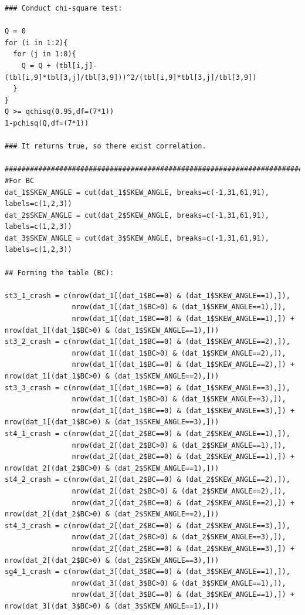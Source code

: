 \documentclass[11pt]{scrartcl} %
\begin{document}
\begin{lstlisting}
### Conduct chi-square test:

Q = 0
for (i in 1:2){
  for (j in 1:8){
    Q = Q + (tbl[i,j]-(tbl[i,9]*tbl[3,j]/tbl[3,9]))^2/(tbl[i,9]*tbl[3,j]/tbl[3,9])
  }
}
Q >= qchisq(0.95,df=(7*1))
1-pchisq(Q,df=(7*1))

### It returns true, so there exist correlation.

################################################################################
#For BC
dat_1$SKEW_ANGLE = cut(dat_1$SKEW_ANGLE, breaks=c(-1,31,61,91), labels=c(1,2,3))
dat_2$SKEW_ANGLE = cut(dat_2$SKEW_ANGLE, breaks=c(-1,31,61,91), labels=c(1,2,3))
dat_3$SKEW_ANGLE = cut(dat_3$SKEW_ANGLE, breaks=c(-1,31,61,91), labels=c(1,2,3))

## Forming the table (BC):

st3_1_crash = c(nrow(dat_1[(dat_1$BC==0) & (dat_1$SKEW_ANGLE==1),]),
                nrow(dat_1[(dat_1$BC>0) & (dat_1$SKEW_ANGLE==1),]),
                nrow(dat_1[(dat_1$BC==0) & (dat_1$SKEW_ANGLE==1),]) + nrow(dat_1[(dat_1$BC>0) & (dat_1$SKEW_ANGLE==1),]))
st3_2_crash = c(nrow(dat_1[(dat_1$BC==0) & (dat_1$SKEW_ANGLE==2),]),
                nrow(dat_1[(dat_1$BC>0) & (dat_1$SKEW_ANGLE==2),]),
                nrow(dat_1[(dat_1$BC==0) & (dat_1$SKEW_ANGLE==2),]) + nrow(dat_1[(dat_1$BC>0) & (dat_1$SKEW_ANGLE==2),]))
st3_3_crash = c(nrow(dat_1[(dat_1$BC==0) & (dat_1$SKEW_ANGLE==3),]),
                nrow(dat_1[(dat_1$BC>0) & (dat_1$SKEW_ANGLE==3),]),
                nrow(dat_1[(dat_1$BC==0) & (dat_1$SKEW_ANGLE==3),]) + nrow(dat_1[(dat_1$BC>0) & (dat_1$SKEW_ANGLE==3),]))
st4_1_crash = c(nrow(dat_2[(dat_2$BC==0) & (dat_2$SKEW_ANGLE==1),]),
                nrow(dat_2[(dat_2$BC>0) & (dat_2$SKEW_ANGLE==1),]),
                nrow(dat_2[(dat_2$BC==0) & (dat_2$SKEW_ANGLE==1),]) + nrow(dat_2[(dat_2$BC>0) & (dat_2$SKEW_ANGLE==1),]))
st4_2_crash = c(nrow(dat_2[(dat_2$BC==0) & (dat_2$SKEW_ANGLE==2),]),
                nrow(dat_2[(dat_2$BC>0) & (dat_2$SKEW_ANGLE==2),]),
                nrow(dat_2[(dat_2$BC==0) & (dat_2$SKEW_ANGLE==2),]) + nrow(dat_2[(dat_2$BC>0) & (dat_2$SKEW_ANGLE==2),]))
st4_3_crash = c(nrow(dat_2[(dat_2$BC==0) & (dat_2$SKEW_ANGLE==3),]),
                nrow(dat_2[(dat_2$BC>0) & (dat_2$SKEW_ANGLE==3),]),
                nrow(dat_2[(dat_2$BC==0) & (dat_2$SKEW_ANGLE==3),]) + nrow(dat_2[(dat_2$BC>0) & (dat_2$SKEW_ANGLE==3),]))
sg4_1_crash = c(nrow(dat_3[(dat_3$BC==0) & (dat_3$SKEW_ANGLE==1),]),
                nrow(dat_3[(dat_3$BC>0) & (dat_3$SKEW_ANGLE==1),]),
                nrow(dat_3[(dat_3$BC==0) & (dat_3$SKEW_ANGLE==1),]) + nrow(dat_3[(dat_3$BC>0) & (dat_3$SKEW_ANGLE==1),]))

\end{lstlisting}
\end{document}
